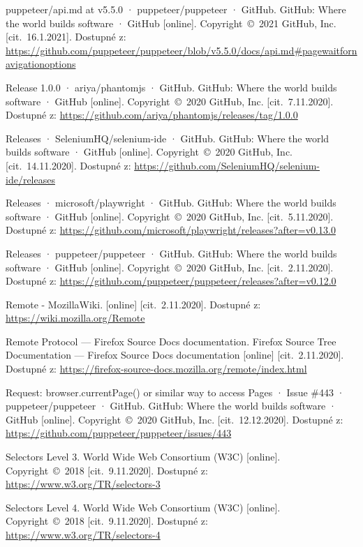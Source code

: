 \begin{thebibliography}{99}
 puppeteer/api.md at v5.5.0 · puppeteer/puppeteer · GitHub. GitHub: Where the world builds software · GitHub [online]. Copyright~©~2021 GitHub, Inc. [cit.~16.1.2021]. Dostupné z: \url{https://github.com/puppeteer/puppeteer/blob/v5.5.0/docs/api.md#pagewaitfornavigationoptions}

 Release 1.0.0 · ariya/phantomjs · GitHub. GitHub: Where the world builds software · GitHub [online]. Copyright~©~2020 GitHub, Inc. [cit.~7.11.2020]. Dostupné z: \url{https://github.com/ariya/phantomjs/releases/tag/1.0.0}

 Releases · SeleniumHQ/selenium-ide · GitHub. GitHub: Where the world builds software · GitHub [online]. Copyright~©~2020 GitHub, Inc. [cit.~14.11.2020]. Dostupné z: \url{https://github.com/SeleniumHQ/selenium-ide/releases}

 Releases · microsoft/playwright · GitHub. GitHub: Where the world builds software · GitHub [online]. Copyright~©~2020 GitHub, Inc. [cit.~5.11.2020]. Dostupné z: \url{https://github.com/microsoft/playwright/releases?after=v0.13.0}

 Releases · puppeteer/puppeteer · GitHub. GitHub: Where the world builds software · GitHub [online]. Copyright~©~2020 GitHub, Inc. [cit.~2.11.2020]. Dostupné z: \url{https://github.com/puppeteer/puppeteer/releases?after=v0.12.0}

 Remote - MozillaWiki. [online] [cit.~2.11.2020]. Dostupné z: \url{https://wiki.mozilla.org/Remote}

 Remote Protocol — Firefox Source Docs documentation. Firefox Source Tree Documentation — Firefox Source Docs documentation [online] [cit.~2.11.2020]. Dostupné z: \url{https://firefox-source-docs.mozilla.org/remote/index.html}

 Request: browser.currentPage() or similar way to access Pages · Issue \#443 · puppeteer/puppeteer · GitHub. GitHub: Where the world builds software · GitHub [online]. Copyright~©~2020 GitHub, Inc. [cit.~12.12.2020]. Dostupné z: \url{https://github.com/puppeteer/puppeteer/issues/443}

 Selectors Level 3. World Wide Web Consortium (W3C) [online]. Copyright~©~2018 [cit.~9.11.2020]. Dostupné z: \url{https://www.w3.org/TR/selectors-3}

 Selectors Level 4. World Wide Web Consortium (W3C) [online]. Copyright~©~2018 [cit.~9.11.2020]. Dostupné z: \url{https://www.w3.org/TR/selectors-4}


\end{thebibliography}
